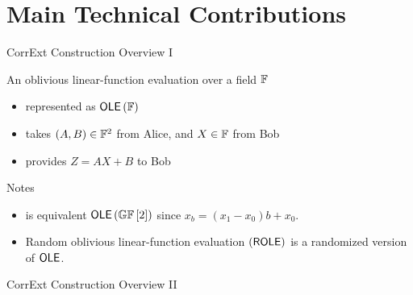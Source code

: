 \section{Main Technical Contributions}
\begin{frame}{CorrExt Construction Overview I}
%		
	\begin{definition}
		An oblivious linear-function evaluation over a field $ {\mathbb F} $
		\begin{itemize}
			\item represented as $ \OLE[\bbF] $
			\item takes $ (A,B) \in {\mathbb F}^2 $ from Alice, and $ X \in {\mathbb F} $ from Bob
			\item provides $ Z = AX +B $ to Bob 
		\end{itemize}  
	\end{definition}
	{
	\begin{block}{Notes}
	\begin{itemize}
		\item  \OT is equivalent $ \OLE[\GF{2}] $ since $ x_b = (x_1 - x_0)b + x_0 $.
		\item Random oblivious linear-function evaluation $ (\ROLE) $ is a randomized version of $ \OLE $.
	\end{itemize}
	\end{block}}
	
\end{frame}

\begin{frame}{CorrExt Construction Overview II}
	
\end{frame}

